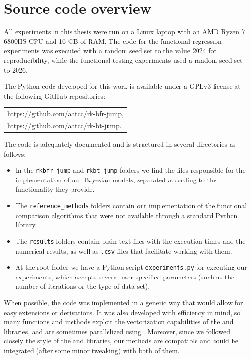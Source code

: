 \chapter{Source code overview}\label{app:source-code}

All experiments in this thesis were run on a Linux laptop with an AMD Ryzen 7 6800HS CPU and 16 GB of RAM. The code for the functional regression experiments was executed with a random seed set to the value 2024 for reproducibility, while the functional testing experiments used a random seed set to 2026. 

The Python code developed for this work is available under a GPLv3 license at the following GitHub repositories: 
\begin{center}
  \begin{tabular}{l}
\url{https://github.com/antcc/rk-bfr-jump},\\
\url{https://github.com/antcc/rk-bt-jump}.
  \end{tabular}
\end{center}

The code is adequately documented and is structured in several directories as follows:

\begin{itemize}
  \item In the \texttt{rkbfr\_jump} and \texttt{rkbt\_jump} folders we find the files responsible for the implementation of our Bayesian models, separated according to the functionality they provide.
  \item The \texttt{reference\_methods} folders contain our implementation of the functional comparison algorithms that were not available through a standard Python library.
  \item The \texttt{results} folders contain plain text files with the execution times and the numerical results, as well as \texttt{.csv} files that facilitate working with them.
  \item At the root folder we have a Python script \texttt{experiments.py} for executing our experiments, which accepts several user-specified parameters (such as the number of iterations or the type of data set).
\end{itemize}

When possible, the code was implemented in a generic way that would allow for easy extensions or derivations. It was also developed with efficiency in mind, so many functions and methods exploit the vectorization capabilities of the  and  libraries, and are sometimes parallelized using . Moreover, since we followed closely the style of the  and  libraries, our methods are compatible and could be integrated (after some minor tweaking) with both of them. 

